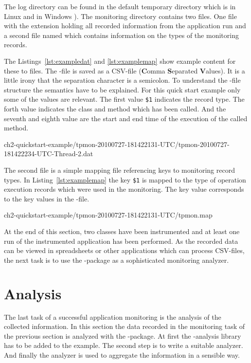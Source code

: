 \noindent The log directory can be found in the default temporary directory which is in Linux  and in Windows ). The monitoring directory contains two files. One file with the extension  holding all recorded information from the application run and a second file named  which contains information on the types of the monitoring records. 

The Listings~\ref{lst:exampledat} and \ref{lst:examplemap} show example content for these to files. The -file is saved as a CSV-file (\textbf{C}omma \textbf{S}eparated \textbf{V}alues). It is a little irony that the separation character is a semicolon. To understand the -file structure the semantics have to be explained. For this quick start example only some of the values are relevant. The first value \verb!$1! indicates the record type. The forth value indicates the class and method which has been called. And the seventh and eighth value are the start and end time of the execution of the called method.

\setBashListing
%
{ch2-quickstart-example/tpmon-20100727-181422131-UTC/tpmon-20100727-181422234-UTC-Thread-2.dat}

\noindent The second file is a simple mapping file referencing keys to monitoring record types. In Listing~\ref{lst:examplemap} the key \verb!$1! is mapped to the type of operation execution records which were used in the monitoring. The key value corresponds to the key values in the -file.

%
{ch2-quickstart-example/tpmon-20100727-181422131-UTC/tpmon.map}

\noindent At the end of this section, two classes have been instrumented and at least one run of the instrumented application has been performed. As the recorded data can be viewed in spreadsheets or other applications which can process CSV-files, the next task is to use the \KiekerAnalysisPart{}-package as a sophisticated monitoring analyzer. 

\section{Analysis}\label{sec:example:analysis}

The last task of a successful application monitoring is the analysis of the collected information. In this section the data recorded in the monitoring task of the previous section is analyzed with the \KiekerAnalysisPart{}-package. At first the \Kieker{}-analysis library has to be added to the example. The second step is to write a suitable analyzer. And finally the analyzer is used to aggregate the information in a sensible way.

